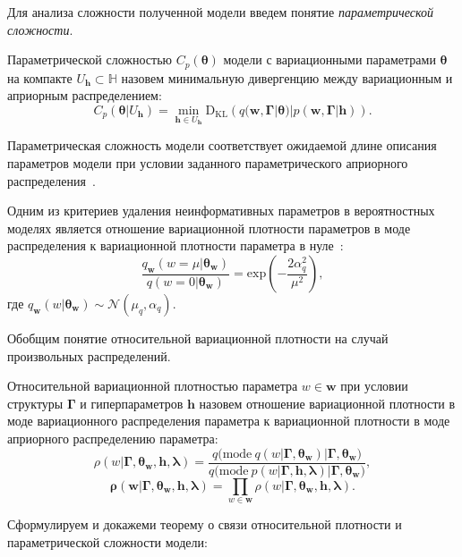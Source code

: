 Для анализа сложности полученной модели введем понятие \textit{параметрической сложности}. 
\begin{defin} 
Параметрической сложностью  $C_p(\boldsymbol{\theta})$ модели с вариационными параметрами $\boldsymbol{\theta}$ на компакте $U_\mathbf{h} \subset \mathbb{H}$ назовем минимальную дивергенцию между вариационным и априорным распределением:
\[
C_p(\boldsymbol{\theta}|U_\mathbf{h}) = \min_{\mathbf{h} \in U_\mathbf{h}} \text{D}_\text{KL}\left(q(\mathbf{w}, \boldsymbol{\Gamma}|\boldsymbol{\theta})|p(\mathbf{w}, \boldsymbol{\Gamma}|\mathbf{h})\right).
\]
\end{defin}
Параметрическая сложность модели соответствует ожидаемой длине описания параметров модели при условии заданного параметрического априорного распределения~\cite{hinton_mdl}.

Одним из критериев удаления неинформативных параметров в вероятностных моделях является отношение вариационной плотности параметров в моде распределения к вариационной плотности параметра в нуле~\cite{nips}:
\[
    \frac{q_\mathbf{w}(w = \mu|\boldsymbol{\theta}_\mathbf{w})}{q(w = 0|\boldsymbol{\theta}_\mathbf{w})} = \text{exp}\left(-\frac{2\alpha_q^2}{\mu^2}\right),
\]
где $q_\mathbf{w}(w|\boldsymbol{\theta}_\mathbf{w}) \sim \mathcal{N}(\mu_q, \alpha_q).$

Обобщим понятие относительной вариационной плотности на случай произвольных распределений.
\begin{defin}
Относительной вариационной   плотностью параметра $w \in \mathbf{w}$  при условии структуры $\boldsymbol{\Gamma}$ и гиперпараметров $\mathbf{h}$ назовем отношение вариационной плотности в моде вариационного распределения параметра к вариационной плотности в моде априорного распределению параметра:
\[
    \rho(w|\boldsymbol{\Gamma}, \boldsymbol{\theta}_\mathbf{w}, \mathbf{h},\boldsymbol{\lambda}) = \frac{q\bigl(\text{mode}~q\left(w|\boldsymbol{\Gamma}, \boldsymbol{\theta}_\mathbf{w}\right)|\boldsymbol{\Gamma}, \boldsymbol{\theta}_\mathbf{w}\bigr)}{q\bigl(\text{mode}~p\left({w}|\boldsymbol{\Gamma}, \mathbf{h},\boldsymbol{\lambda}\right)|\boldsymbol{\Gamma},\boldsymbol{\theta}_\mathbf{w}\bigr)},
\]
\[
    \boldsymbol{\rho}(\mathbf{w}|\boldsymbol{\Gamma}, \boldsymbol{\theta}_\mathbf{w}, \mathbf{h},\boldsymbol{\lambda}) = \prod_{w \in \mathbf{w}}\rho(w|\boldsymbol{\Gamma}, \boldsymbol{\theta}_\mathbf{w}, \mathbf{h},\boldsymbol{\lambda}).
\]

\end{defin}

Сформулируем и докажеми теорему о связи относительной плотности и параметрической сложности модели:

